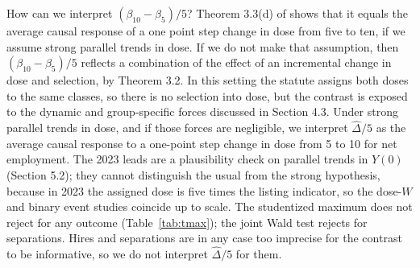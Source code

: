 \documentclass[12pt,a4paper]{article}
\begin{document}
How can we interpret $(\beta_{10}-\beta_5)/5$? Theorem 3.3(d) of \citet{callaway2024} shows that it equals the average causal response of a one point step change in dose from five to ten, if we assume strong parallel trends in dose. If we do not make that assumption, then $(\beta_{10}-\beta_5)/5$ reflects a combination of the effect of an incremental change in dose and selection, by Theorem 3.2. In this setting the statute assigns both doses to the same classes, so there is no selection into dose, but the contrast is exposed to the dynamic and group-specific forces discussed in Section 4.3. Under strong parallel trends in dose, and if those forces are negligible, we interpret $\hat\Delta/5$ as the average causal response to a one-point step change in dose from 5 to 10 for net employment. The 2023 leads are a plausibility check on parallel trends in $Y(0)$ (Section 5.2); they cannot distinguish the usual from the strong hypothesis, because in 2023 the assigned dose is five times the listing indicator, so the dose-$W$ and binary event studies coincide up to scale. The studentized maximum does not reject for any outcome (Table~\ref{tab:tmax}); the joint Wald test rejects for separations. Hires and separations are in any case too imprecise for the contrast to be informative, so we do not interpret $\hat\Delta/5$ for them.
\end{document}
